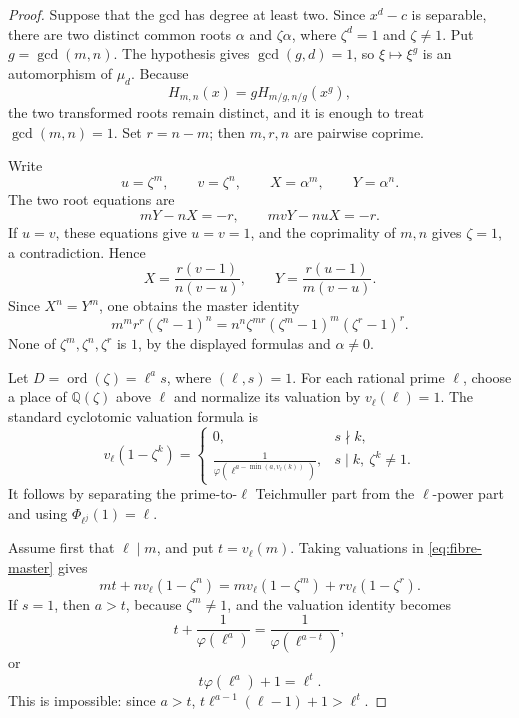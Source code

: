 \documentclass[11pt]{article}
\theoremstyle{definition}
\newcommand{\Q}{\mathbb Q}
\newcommand{\ord}{\operatorname{ord}}
\begin{document}
\begin{proof}
Suppose that the gcd has degree at least two.  Since \(x^d-c\) is
separable, there are two distinct common roots \(\alpha\) and
\(\zeta\alpha\), where \(\zeta^d=1\) and \(\zeta\neq1\).  Put
\(g=\gcd(m,n)\).  The hypothesis gives \(\gcd(g,d)=1\), so
\(\xi\mapsto\xi^g\) is an automorphism of \(\mu_d\).  Because
\[
 H_{m,n}(x)=gH_{m/g,n/g}(x^g),
\]
the two transformed roots remain distinct, and it is enough to treat
\(\gcd(m,n)=1\).  Set \(r=n-m\); then \(m,r,n\) are pairwise coprime.

Write
\[
 u=\zeta^m,\qquad v=\zeta^n,\qquad
 X=\alpha^m,\qquad Y=\alpha^n.
\]
The two root equations are
\[
 mY-nX=-r,\qquad mvY-nuX=-r.
\]
If \(u=v\), these equations give \(u=v=1\), and the coprimality of
\(m,n\) gives \(\zeta=1\), a contradiction.  Hence
\[
 X=\frac{r(v-1)}{n(v-u)},\qquad
 Y=\frac{r(u-1)}{m(v-u)}.
\]
Since \(X^n=Y^m\), one obtains the master identity
\begin{equation}
 m^m r^r(\zeta^n-1)^n
 =n^n\zeta^{mr}(\zeta^m-1)^m(\zeta^r-1)^r.
 \tag{14.F1}\label{eq:fibre-master}
\end{equation}
None of \(\zeta^m,\zeta^n,\zeta^r\) is \(1\), by the displayed formulas
and \(\alpha\neq0\).

Let \(D=\ord(\zeta)=\ell^a s\), where \((\ell,s)=1\).  For each
rational prime \(\ell\), choose a place of \(\Q(\zeta)\) above \(\ell\)
and normalize its valuation by \(v_\ell(\ell)=1\).  The standard
cyclotomic valuation formula is
\[
 v_\ell(1-\zeta^k)=
 \begin{cases}
 0,&s\nmid k,\\[2mm]
 \displaystyle
 \frac1{\varphi(\ell^{a-\min(a,v_\ell(k))})},
 &s\mid k,\ \zeta^k\neq1.
 \end{cases}
\]
It follows by separating the prime-to-\(\ell\) Teichmuller part from the
\(\ell\)-power part and using \(\Phi_{\ell^j}(1)=\ell\).

Assume first that \(\ell\mid m\), and put \(t=v_\ell(m)\).  Taking
valuations in \eqref{eq:fibre-master} gives
\begin{equation}
 mt+n v_\ell(1-\zeta^n)
 =m v_\ell(1-\zeta^m)+r v_\ell(1-\zeta^r).
 \tag{14.F2}\label{eq:fibre-valuation}
\end{equation}
If \(s=1\), then \(a>t\), because \(\zeta^m\neq1\), and the valuation
identity becomes
\[
 t+\frac1{\varphi(\ell^a)}
 =\frac1{\varphi(\ell^{a-t})},
\]
or
\[
 t\varphi(\ell^a)+1=\ell^t.
\]
This is impossible: since \(a>t\),
\(t\ell^{a-1}(\ell-1)+1>\ell^t\).


\end{proof}
\end{document}
